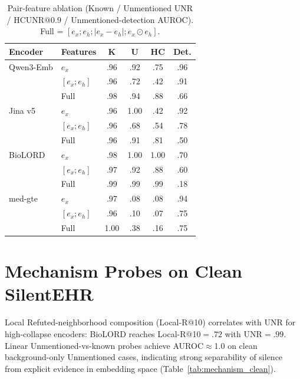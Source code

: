 \documentclass[11pt]{article}
\begin{document}
\begin{table}[!htbp]
  \centering
  \scriptsize
  \renewcommand{\arraystretch}{1.06}
  \caption{Pair-feature ablation (Known / Unmentioned UNR / HCUNR@0.9 /
  Unmentioned-detection AUROC). Full = $[e_x;e_h;|e_x-e_h|;e_x\odot e_h]$.}
  \label{tab:pair_ablation}
  \begin{tabular*}{\columnwidth}{@{\extracolsep{\fill}}llcccc@{}}
    \toprule
    \textbf{Encoder} & \textbf{Features} & \textbf{K} & \textbf{U} &
    \textbf{HC} & \textbf{Det.} \\
    \midrule
    Qwen3-Emb & $e_x$ & .96 & .92 & .75 & .96 \\
                & $[e_x;e_h]$ & .96 & .72 & .42 & .91 \\
                & Full & .98 & .94 & .88 & .66 \\
    Jina v5   & $e_x$ & .96 & 1.00 & .42 & .92 \\
                & $[e_x;e_h]$ & .96 & .68 & .54 & .78 \\
                & Full & .96 & .91 & .81 & .50 \\
    BioLORD   & $e_x$ & .98 & 1.00 & 1.00 & .70 \\
                & $[e_x;e_h]$ & .97 & .92 & .88 & .60 \\
                & Full & .99 & .99 & .99 & .18 \\
    med-gte   & $e_x$ & .97 & .08 & .08 & .94 \\
                & $[e_x;e_h]$ & .96 & .10 & .07 & .75 \\
                & Full & 1.00 & .38 & .16 & .75 \\
    \bottomrule
  \end{tabular*}
\end{table}

\section{Mechanism Probes on Clean SilentEHR}
\label{app:mechanism_clean}

Local Refuted-neighborhood composition (Local-R@10) correlates with UNR for
high-collapse encoders: BioLORD reaches Local-R@10$=.72$ with UNR$=.99$.
Linear Unmentioned-vs-known probes achieve AUROC$\approx$1.0 on clean
background-only Unmentioned cases, indicating strong separability of silence
from explicit evidence in embedding space (Table~\ref{tab:mechanism_clean}).
\end{document}
